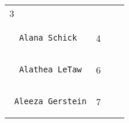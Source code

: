 \documentclass[]{article}
\begin{document}
\begin{longtable}[c]{@{}llll@{}}
\begin{minipage}[t]{0.10\columnwidth}
3
\end{minipage} & \begin{minipage}[t]{0.13\columnwidth}\raggedright
\end{minipage} & \begin{minipage}[t]{0.15\columnwidth}\raggedright
\end{minipage}
\\\noalign{\medskip}
\begin{minipage}[t]{0.39\columnwidth}\raggedright
\begin{verbatim}
  Alana Schick
\end{verbatim}
\end{minipage} & \begin{minipage}[t]{0.10\columnwidth}\raggedright
4
\end{minipage} & \begin{minipage}[t]{0.13\columnwidth}\raggedright
\end{minipage} & \begin{minipage}[t]{0.15\columnwidth}\raggedright
\end{minipage}
\\\noalign{\medskip}
\begin{minipage}[t]{0.39\columnwidth}\raggedright
\begin{verbatim}
  Alathea LeTaw
\end{verbatim}
\end{minipage} & \begin{minipage}[t]{0.10\columnwidth}\raggedright
6
\end{minipage} & \begin{minipage}[t]{0.13\columnwidth}\raggedright
\end{minipage} & \begin{minipage}[t]{0.15\columnwidth}\raggedright
\end{minipage}
\\\noalign{\medskip}
\begin{minipage}[t]{0.39\columnwidth}\raggedright
\begin{verbatim}
 Aleeza Gerstein
\end{verbatim}
\end{minipage} & \begin{minipage}[t]{0.10\columnwidth}\raggedright
7
\end{minipage} & \begin{minipage}[t]{0.13\columnwidth}\raggedright
\end{minipage} & \begin{minipage}[t]{0.15\columnwidth}\raggedright

\end{minipage}
\end{longtable}
\end{document}
